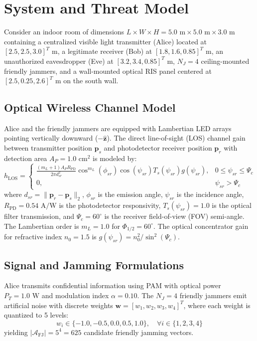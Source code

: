 \documentclass[journal,10pt,twocolumn]{IEEEtran}
\begin{document}
\section{System and Threat Model}
Consider an indoor room of dimensions $L \times W \times H = 5.0\text{ m} \times 5.0\text{ m} \times 3.0\text{ m}$ containing a centralized visible light transmitter (Alice) located at $[2.5, 2.5, 3.0]^T\text{ m}$, a legitimate receiver (Bob) at $[1.8, 1.6, 0.85]^T\text{ m}$, an unauthorized eavesdropper (Eve) at $[3.2, 3.4, 0.85]^T\text{ m}$, $N_J = 4$ ceiling-mounted friendly jammers, and a wall-mounted optical RIS panel centered at $[2.5, 0.25, 2.6]^T\text{ m}$ on the south wall.

\subsection{Optical Wireless Channel Model}
Alice and the friendly jammers are equipped with Lambertian LED arrays pointing vertically downward ($-\hat{\mathbf{z}}$). The direct line-of-sight (LOS) channel gain between transmitter position $\mathbf{p}_s$ and photodetector receiver position $\mathbf{p}_r$ with detection area $A_P = 1.0\text{ cm}^2$ is modeled by:
\begin{equation}
h_{\text{LOS}} = \begin{cases} 
\frac{(m_L + 1) A_P R_{\text{PD}}}{2\pi d_{sr}^2} \cos^{m_L}(\phi_{sr}) \cos(\psi_{sr}) T_s(\psi_{sr}) g(\psi_{sr}), & 0 \le \psi_{sr} \le \Psi_c \\ 
0, & \psi_{sr} > \Psi_c 
\end{cases}
\end{equation}
where $d_{sr} = \|\mathbf{p}_r - \mathbf{p}_s\|_2$, $\phi_{sr}$ is the emission angle, $\psi_{sr}$ is the incidence angle, $R_{\text{PD}} = 0.54\text{ A/W}$ is the photodetector responsivity, $T_s(\psi_{sr}) = 1.0$ is the optical filter transmission, and $\Psi_c = 60^\circ$ is the receiver field-of-view (FOV) semi-angle. The Lambertian order is $m_L = 1.0$ for $\Phi_{1/2} = 60^\circ$. The optical concentrator gain for refractive index $n_0 = 1.5$ is $g(\psi_{sr}) = n_0^2 / \sin^2(\Psi_c)$.

\subsection{Signal and Jamming Formulations}
Alice transmits confidential information using PAM with optical power $P_T = 1.0\text{ W}$ and modulation index $\alpha = 0.10$. The $N_J = 4$ friendly jammers emit artificial noise with discrete weights $\mathbf{w} = [w_1, w_2, w_3, w_4]^T$, where each weight is quantized to 5 levels:
\begin{equation}
w_i \in \{-1.0, -0.5, 0.0, 0.5, 1.0\}, \quad \forall i \in \{1, 2, 3, 4\}
\end{equation}
yielding $|\mathcal{A}_{\text{FJ}}| = 5^4 = 625$ candidate friendly jamming vectors.
\end{document}
